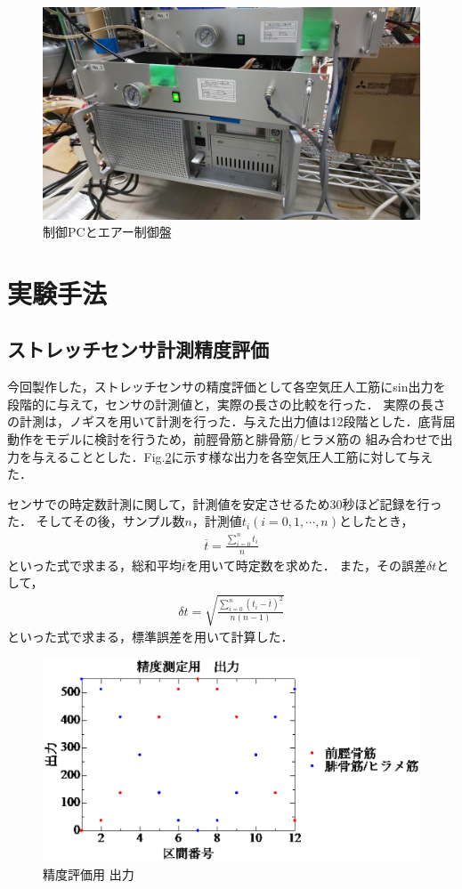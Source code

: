 \begin{figure}[h]
    \begin{center}
     \includegraphics[width=0.65\columnwidth,clip]{./3_analysis/PC.eps}
     \caption{制御PCとエアー制御盤}
     \label{fig:PC}
    \end{center}
\end{figure}

\newpage

\section{実験手法}
\subsection{ストレッチセンサ計測精度評価}
今回製作した，ストレッチセンサの精度評価として各空気圧人工筋にsin出力を段階的に与えて，センサの計測値と，実際の長さの比較を行った．
実際の長さの計測は，ノギスを用いて計測を行った．与えた出力値は12段階とした．底背屈動作をモデルに検討を行うため，前脛骨筋と腓骨筋/ヒラメ筋の
組み合わせで出力を与えることとした．Fig.\ref{output_for_test}に示す様な出力を各空気圧人工筋に対して与えた．

センサでの時定数計測に関して，計測値を安定させるため30秒ほど記録を行った．
そしてその後，サンプル数$n$，計測値$t_i \left(i=0,1,\cdots,n\right)$としたとき，
\begin{eqnarray}
        \overline{t}=\frac{\sum_{i=0}^n t_i}{n}
\end{eqnarray}
といった式で求まる，総和平均$\overline{t}$を用いて時定数を求めた．
また，その誤差$\delta t$として，
\begin{eqnarray}
    \delta t = \sqrt{ \frac{\sum_{i=0}^n \left(t_i-\overline{t}\right)^2}{n(n-1)}}
\end{eqnarray}
といった式で求まる，標準誤差を用いて計算した．

\begin{figure}[h]
    \begin{center}
        \includegraphics[width=0.78\columnwidth,clip]{2_measurement/output/output.eps}
        \caption{精度評価用 出力}
        \label{output_for_test}
    \end{center}
\end{figure}